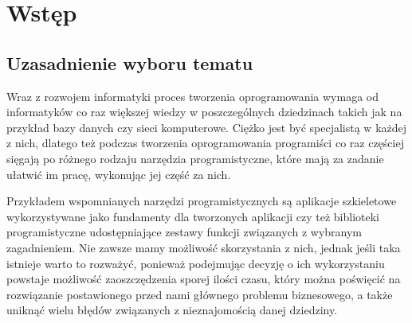 \documentclass[12pt]{report}
\begin{document}





\tableofcontents

\chapter{Wstęp} \label{wstep}

\section{Uzasadnienie wyboru tematu}

Wraz z rozwojem informatyki proces tworzenia oprogramowania wymaga od informatyków co raz większej wiedzy w poszczególnych dziedzinach takich jak na przykład bazy 
danych czy sieci komputerowe. Ciężko jest być specjalistą w każdej z nich, dlatego też podczas tworzenia oprogramowania programiści co raz częściej sięgają po różnego 
rodzaju narzędzia programistyczne, które mają za zadanie uła\-twić im pracę, wykonując jej część za nich.

Przykładem wspomnianych narzędzi programistycznych są aplikacje szkieletowe wykorzystywane jako fundamenty dla tworzonych aplikacji czy też biblioteki programistyczne
udostępniające zestawy funkcji związanych z wybranym zagadnieniem. Nie zawsze mamy możliwość skorzystania z nich, jednak jeśli taka istnieje warto to rozważyć,
ponieważ podejmując decyzję o ich wykorzystaniu powstaje możliwość zaoszczędzenia sporej ilości czasu, który można poświęcić na rozwią\-zanie postawionego przed nami
głównego problemu biznesowego, a także uniknąć wielu błędów związanych z nieznajomością danej dziedziny.
\end{document}
